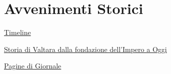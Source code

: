 \section{Avvenimenti Storici}\label{avvenimenti-storici}

\href{Timeline\%2024a1465b712f46819ddc97f22185e300.csv}{Timeline}

\href{Storia\%20di\%20Valtara\%20dalla\%20fondazione\%20dell\%E2\%80\%99Impero\%20a\%20O\%20ee7e3c4d206f4871b1992b9803fd0c21.md}{Storia
di Valtara dalla fondazione dell'Impero a Oggi}

\href{Pagine\%20di\%20Giornale\%20472999bb2cdb45cf90be6ef2842d0f2f.md}{Pagine
di Giornale}
